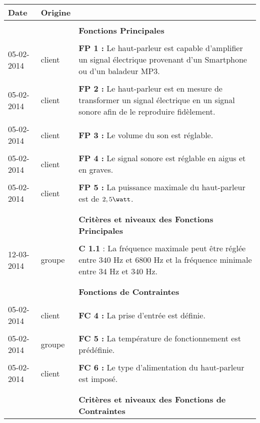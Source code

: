 \begin{tabular}{|p{2cm}|p{1.5cm}|p{13.2cm}|}
 		\textbf{Date} & \textbf{Origine} & \\
 \hline
 	& &\\
		& & \textbf{Fonctions Principales} \\
 	& &\\
		05-02-2014 & client & \textbf{FP 1 :} Le haut-parleur est capable d’amplifier un signal électrique provenant d’un Smartphone ou d’un baladeur MP3.\\
	& &\\
		05-02-2014 & client & \textbf{FP 2 :} Le haut-parleur est en mesure de transformer un signal électrique en un signal sonore afin de le reproduire fidèlement.  \\
	& &\\
		05-02-2014 & client & \textbf{FP 3 :} Le volume du son est réglable.\\
	& &\\
		05-02-2014 & client & \textbf{FP 4 :} Le signal sonore est réglable en aigus et en graves.\\
	& &\\
		05-02-2014 & client & \textbf{FP 5 :} La puissance maximale du haut-parleur est de $2,5  \watt$.\\
	& &\\
\hline
	 & &\\
	 	& & \textbf{Critères et niveaux des Fonctions Principales} \\
	 & &\\
	 	12-03-2014 & groupe & \textbf{C 1.1} : La fréquence maximale peut être réglée entre $340$ Hz et $6800$ Hz et la fréquence minimale entre $34$ Hz et $340$ Hz.\\
	 & &\\
\hline
	 & &\\
	 & & \textbf{ Fonctions de Contraintes}\\
	 & &\\
		05-02-2014 & client & \textbf{FC 4 :} La prise d’entrée est définie.\\
	 & &\\
		05-02-2014 & groupe & \textbf{FC 5 :} La température de fonctionnement est prédéfinie.\\
	 & &\\
		05-02-2014 & client & \textbf{FC 6 :} Le type d’alimentation du haut-parleur est imposé.\\
	 & &\\
\hline
	& &\\
		& & \textbf{ Critères et niveaux des Fonctions de Contraintes}\\

\end{tabular}
